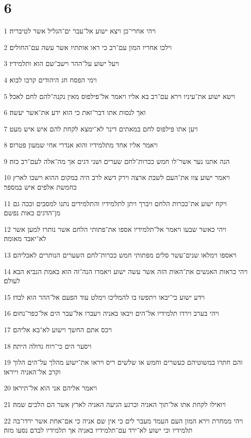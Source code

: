 \chapter{6}

\par 1 ויהי אחרי־כן ויצא ישוע אל־עבר ים־הגליל אשר לטיבריה׃
\par 2 וילכו אחריו המון עם־רב כי ראו אותתיו אשר עשה עם־החולים׃
\par 3 ויעל ישוע על־ההר וישב־שם הוא ותלמידיו׃
\par 4 וימי הפסח חג היהודים קרבו לבוא׃
\par 5 וישא ישוע את־עיניו וירא עם־רב בא אליו ויאמר אל־פילפוס מאין נקנה־להם לחם לאכל׃
\par 6 ואך לנסות אתו דבר־זאת כי הוא ידע את־אשר יעשה׃
\par 7 ויען אתו פילפוס לחם במאתים דינר לא־ימצא לקחת להם איש איש מעט׃
\par 8 ויאמר אליו אחד מתלמידיו והוא אנדרי אחי שמעון פטרוס׃
\par 9 הנה אתנו נער אשר־לו חמש ככרות־לחם שערים ושני דגים אך מה־אלה לעם־רב כזה׃
\par 10 ויאמר ישוע צוו את־העם לשבת ארצה וירק דשא לרב היה במקום ההוא וישבו לארץ כחמשת אלפים איש במספר׃
\par 11 ויקח ישוע את־ככרות הלחם ויברך ויתן לתלמידיו והתלמידים נתנו למסבים וככה גם מן־הדגים כאות נפשם׃
\par 12 ויהי כאשר שבעו ויאמר אל־תלמידיו אספו את־פתותי הלחם אשר נותרו למען אשר לא־יאבד מאומה׃
\par 13 ויאספו וימלאו שנים־עשר סלים מפתותי חמש ככרות־לחם השערים הנותרים לאכליהם׃
\par 14 ויהי כראות האנשים את־האות הזה אשר עשה ישוע ויאמרו הנה־זה הוא באמת הנביא הבא לעולם׃
\par 15 וידע ישוע כי־יבאו ויתפשו בו להמליכו וימלט עוד הפעם אל־ההר הוא לבדו׃
\par 16 ויהי בערב וירדו תלמידיו אל־הים ויבאו באניה ויעברו אל־עבר הים אל־כפר־נחום׃
\par 17 ויכס אתם החשך וישוע לא־בא אליהם׃
\par 18 ויסער הים כי־רוח גדולה היתה׃
\par 19 והם חתרו במשוטיהם כעשרים וחמש או שלשים ריס ויראו את־ישוע מהלך על־הים הלוך וקרב אל־האניה וייראו׃
\par 20 ויאמר אליהם אני הוא אל־תיראו׃
\par 21 ויואילו לקחת אתו אל־תוך האניה וכרגע הגיעה האניה לארץ אשר הם הלכים שמה׃
\par 22 ויהי ממחרת וירא המון העם העמד מעבר לים כי אין שם אניה כי אם־אחת אשר ירדו־בה תלמידיו וכי ישוע לא־ירד עם־תלמידיו באניה אך תלמידיו לבדם נסעו מזה׃
